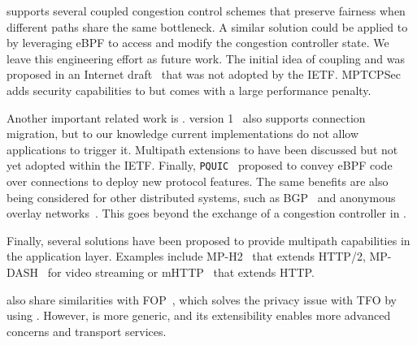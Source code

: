 \mptcp \cite{raiciu2012hard,rfc6824} supports several coupled congestion
control schemes \cite{peng2014multipath,wischik2011design,khalili2013mptcp}
that preserve fairness when different paths share the same bottleneck. A
similar solution  could be applied to \tcpls by leveraging eBPF to access and
modify the  congestion controller state. We leave this engineering effort as
future work. The initial idea of coupling \mptcp and \tls was proposed in an
Internet draft~\cite{draft-paasch-mptcp-ssl-00} that was not adopted by the
IETF. MPTCPSec~\cite{jadin2017securing} adds security capabilities to \mptcp but
comes with a large performance penalty.

Another important related work is \quic. %
\quic version 1~\cite{rfc9000} also supports connection migration, but to our 
knowledge current implementations do not allow applications to trigger  it. 
Multipath extensions
\cite{viernickel2018multipath,de2017multipath,draft-liu-multipath-quic-02,I-D.lmbdhk-quic-multipath}
to \quic have been discussed but not yet adopted within the IETF. Finally,
\texttt{PQUIC}~\cite{de2019pluginizing} proposed to convey eBPF code over \quic
connections to deploy new protocol features. The same benefits are also being
considered for other distributed systems, such as BGP~\cite{xBGP} and
anonymous overlay networks~\cite{fan-hotpets}. This goes beyond the exchange of 
a congestion controller in \tcpls.

Finally, several solutions have been proposed to provide multipath capabilities
in the application layer. Examples include MP-H2~\cite{nikravesh2019mp} that
extends HTTP/2, MP-DASH~\cite{han2016mp} for video streaming or mHTTP~\cite{kim2014multi} that extends HTTP.

\tcpls also share similarities with \tls FOP~\cite{sy2020enhanced}, which
solves the privacy issue with TFO by using \tls. However, \tcpls is more 
generic, and its extensibility enables more advanced concerns and transport 
services.


